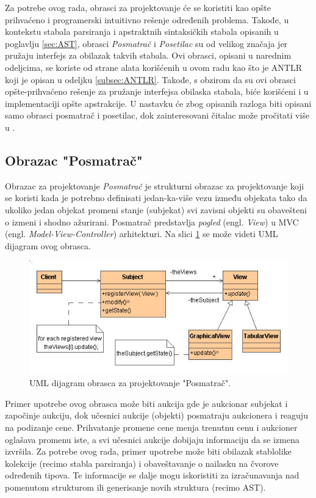 Za potrebe ovog rada, obrasci za projektovanje će se koristiti kao opšte prihvaćeno i programerski intuitivno rešenje određenih problema. Takođe, u kontekstu stabala parsiranja i apstraktnih sintaksičkih stabala opisanih u poglavlju \ref{sec:AST}, obrasci \emph{Posmatrač} i \emph{Posetilac} su od velikog značaja jer pružaju interfejs za obilazak takvih stabala. Ovi obrasci, opisani u narednim odeljcima, se koriste od strane alata korišćenih u ovom radu kao što je ANTLR koji je opisan u odeljku \ref{subsec:ANTLR}. Takođe, s obzirom da su ovi obrasci opšte-prihvaćeno rešenje za pružanje interfejsa obilaska stabala, biće korišćeni i u implementaciji opšte apstrakcije. U nastavku će zbog opisanih razloga biti opisani samo obrasci posmatrač i posetilac, dok zainteresovani čitalac može pročitati više u \cite{DesignPatternsBook}.

\subsection{Obrazac "Posmatrač"}
\label{subsec:DesignPatternsObserver}

Obrazac za projektovanje \emph{Posmatrač} je strukturni obrazac za projektovanje koji se koristi kada je potrebno definisati jedan-ka-više vezu između objekata tako da ukoliko jedan objekat promeni stanje (subjekat) svi zavisni objekti su obavešteni o izmeni i shodno ažurirani. Posmatrač predstavlja \emph{pogled} (engl. \emph{View}) u MVC (engl. \emph{Model-View-Controller}) arhitekturi. Na slici \ref{fig:UMLObserver} se može videti UML dijagram \cite{UML} ovog obrasca. 

\begin{figure}[h!]
\centering
\includegraphics[scale=0.7]{images/observer.jpg}
\caption{UML dijagram obrasca za projektovanje "Posmatrač".} 
\label{fig:UMLObserver}
\end{figure}

Primer upotrebe ovog obrasca može biti aukcija gde je aukcionar subjekat i započinje aukciju, dok učesnici aukcije (objekti) posmatraju aukcionera i reaguju na podizanje cene. Prihvatanje promene cene menja trenutnu cenu i aukcioner oglašava promenu iste, a svi učesnici aukcije dobijaju informaciju da se izmena izvršila. Za potrebe ovog rada, primer upotrebe može biti obilazak stablolike kolekcije (recimo stabla parsiranja) i obaveštavanje o nailasku na čvorove određenih tipova. Te informacije se dalje mogu iskoristiti za izračunavanja nad pomenutom strukturom ili generisanje novih struktura (recimo AST). 

